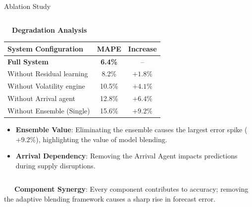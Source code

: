 \documentclass{beamer}
\begin{document}
\begin{frame}{Ablation Study}
\begin{columns}[T]
    \begin{column}{0.48\textwidth}
        \begin{smallcard}[0.98\textwidth, top=3pt, bottom=3pt, left=4pt, right=4pt, boxsep=0.5pt]
            \centering \textbf{\textcolor{primaryDark}{\small {}~~Degradation Analysis}}
            \vspace{0.08cm}
            \fontsize{6.8pt}{8.2pt}\selectfont
            \begin{table}
            \centering
            \begin{tabular}{l c c}
                \toprule
                \textbf{System Configuration} & \textbf{MAPE} & \textbf{Increase} \\
                \midrule
                \textbf{Full System} & \textbf{6.4\%} & -- \\
                Without Residual learning & 8.2\% & $+1.8\%$ \\
                Without Volatility engine & 10.5\% & $+4.1\%$ \\
                Without Arrival agent & 12.8\% & $+6.4\%$ \\
                Without Ensemble (Single) & 15.6\% & $+9.2\%$ \\
                \bottomrule
            \end{tabular}
            \end{table}
            \vspace{-0.1cm}
            \begin{itemize}\setlength\itemsep{2.5pt}\setlength\parskip{0pt}
                \item \textbf{Ensemble Value}: Eliminating the ensemble causes the largest error spike ($+9.2\%$), highlighting the value of model blending.
                \item \textbf{Arrival Dependency}: Removing the Arrival Agent impacts predictions during supply disruptions.
            \end{itemize}
        \end{smallcard}
    \end{column}
\end{columns}

\vspace{0.15cm}
\begin{tcolorbox}[enhanced, colback=primaryblue!4, colframe=primaryblue!30, boxrule=0.35pt,
  arc=3.5pt, width=0.98\textwidth, left=4pt, right=4pt, top=2.5pt, bottom=2.5pt, boxsep=0pt,
  halign=center, shadow={0.5pt}{-0.5pt}{0pt}{black!8}]
    \fontsize{5.5pt}{6.5pt}\selectfont
    \textcolor{primaryDark}{~~~\textbf{Component Synergy}: Every component contributes to accuracy; removing the adaptive blending framework causes a sharp rise in forecast error.}
\end{tcolorbox}
\end{frame}
\end{document}
